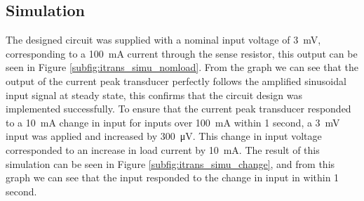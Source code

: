 \subsection{Simulation} \label{sec:itrans_simu}
The designed circuit was supplied with a nominal input voltage of \SI{3}{\milli \volt}, corresponding to a \SI{100}{\milli A} current through the sense resistor, this output can be seen in Figure \ref{subfig:itrans_simu_nomload}. From the graph we can see that the output of the current peak transducer perfectly follows the amplified sinusoidal input signal at steady state, this confirms that the circuit design was implemented successfully. To ensure that the current peak transducer responded to a \SI{10}{\milli A} change in input for inputs over \SI{100}{\milli A} within 1 second, a \SI{3}{\milli \volt} input was applied and increased by \SI{300}{\micro \volt}. This change in input voltage corresponded to an increase in load current by \SI{10}{\milli A}. The result of this simulation can be seen in Figure \ref{subfig:itrans_simu_change}, and from this graph we can see that the input responded to the change in input in within 1 second. 
